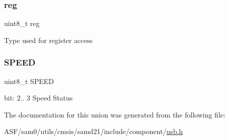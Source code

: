 \subsubsection{\texorpdfstring{reg}{reg}}
{\footnotesize\ttfamily uint8\+\_\+t reg}

Type used for register access \mbox{\label{union_u_s_b___h_o_s_t___s_t_a_t_u_s___type_a7244b81de139c5a3f12fbb9eb8e89647}} 
\subsubsection{\texorpdfstring{SPEED}{SPEED}}
{\footnotesize\ttfamily uint8\+\_\+t S\+P\+E\+ED}

bit\+: 2.. 3 Speed Status 

The documentation for this union was generated from the following file\+:\begin{DoxyCompactItemize}
\item 
A\+S\+F/sam0/utils/cmsis/samd21/include/component/\mbox{\hyperlink{component_2usb_8h}{usb.\+h}}\end{DoxyCompactItemize}
